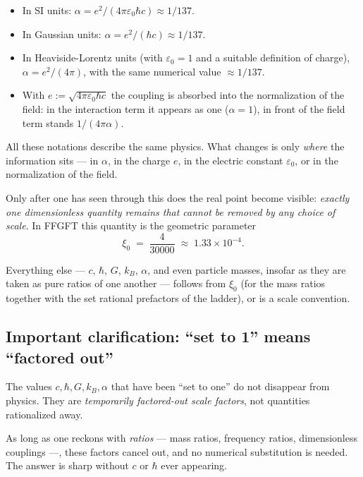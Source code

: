 \begin{itemize}\setlength\itemsep{0pt}
  \item In SI units: $\alpha = e^{2}/(4\pi\varepsilon_{0}\hbar c) \approx 1/137$.
  \item In Gaussian units: $\alpha = e^{2}/(\hbar c) \approx 1/137$.
  \item In Heaviside-Lorentz units (with $\varepsilon_{0} = 1$
        and a suitable definition of charge), $\alpha = e^{2}/(4\pi)$,
        with the same numerical value $\approx 1/137$.
  \item With $e := \sqrt{4\pi\varepsilon_{0}\hbar c}$ the coupling is
        absorbed into the normalization of the field: in the interaction
        term it appears as one ($\alpha = 1$), in front of the field term
        stands $1/(4\pi\alpha)$.
\end{itemize}

All these notations describe the same physics. What changes is only
\emph{where} the information sits --- in $\alpha$, in the charge $e$,
in the electric constant $\varepsilon_{0}$, or in the normalization of
the field.

Only after one has seen through this does the real point become
visible: \emph{exactly one dimensionless quantity remains that cannot
be removed by any choice of scale}. In FFGFT this quantity is the
geometric parameter
\[
  \xi_{0} \;=\; \frac{4}{30000} \;\approx\; 1{.}33 \times 10^{-4}.
\]

Everything else --- $c$, $\hbar$, $G$, $k_B$, $\alpha$, and even
particle masses, insofar as they are taken as pure ratios of one
another --- follows from $\xi_{0}$ (for the mass ratios together with
the set rational prefactors of the ladder), or is a scale convention.

\subsection*{Important clarification: ``set to 1'' means ``factored out''}

The values $c, \hbar, G, k_B, \alpha$ that have been ``set to one'' do
not disappear from physics. They are \emph{temporarily factored-out
scale factors}, not quantities rationalized away.

As long as one reckons with \emph{ratios} --- mass ratios, frequency
ratios, dimensionless couplings ---, these factors cancel out, and no
numerical substitution is needed. The answer is sharp without $c$ or
$\hbar$ ever appearing.

